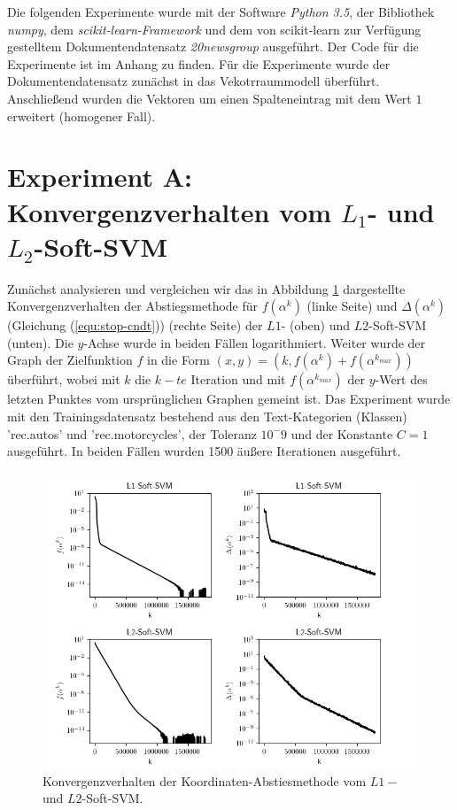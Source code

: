 Die folgenden Experimente wurde mit der Software \emph{Python 3.5}, der Bibliothek \emph{numpy}, dem \emph{scikit-learn-Framework} und dem von scikit-learn zur Verfügung gestelltem Dokumentendatensatz \emph{20newsgroup} ausgeführt. Der Code für die Experimente ist im Anhang zu finden. Für die Experimente wurde der Dokumentendatensatz zunächst in das Vekotrraummodell überführt. Anschließend wurden die Vektoren um einen Spalteneintrag mit dem Wert $1$ erweitert (homogener Fall).

\section{Experiment A: Konvergenzverhalten vom $L_1$- und $L_2$-Soft-SVM}
Zunächst analysieren und vergleichen wir das in Abbildung \ref{img:exp-1} dargestellte Konvergenzverhalten der Abstiegsmethode für $f(\alpha^k)$ (linke Seite) und $\Delta(\alpha^k)$ (Gleichung (\ref{equ:stop-cndt})) (rechte Seite) der $L1$- (oben) und $L2$-Soft-SVM (unten). Die $y$-Achse wurde in beiden Fällen logarithmiert. Weiter wurde der Graph der Zielfunktion $f$ in die Form $(x,y) = (k,f(\alpha^k)+f(\alpha^{k_{max}}))$ überführt, wobei mit $k$ die $k-te$ Iteration und mit $f(\alpha^{k_{max}})$ der $y$-Wert des letzten Punktes vom ursprünglichen Graphen gemeint ist. Das Experiment wurde  mit den Trainingsdatensatz bestehend aus den Text-Kategorien (Klassen) 'rec.autos' und 'rec.motorcycles', der Toleranz $10^-9$ und der Konstante $C=1$ ausgeführt. In beiden Fällen wurden 1500 äußere Iterationen ausgeführt. 
\begin{figure}[htbp]
	\centering
	\includegraphics[scale=0.4]{abbildungen/exp-a.png}
	\caption{Konvergenzverhalten der Koordinaten-Abstiesmethode vom $L1-$ und $L2$-Soft-SVM.}
	\label{img:exp-1}
\end{figure}

